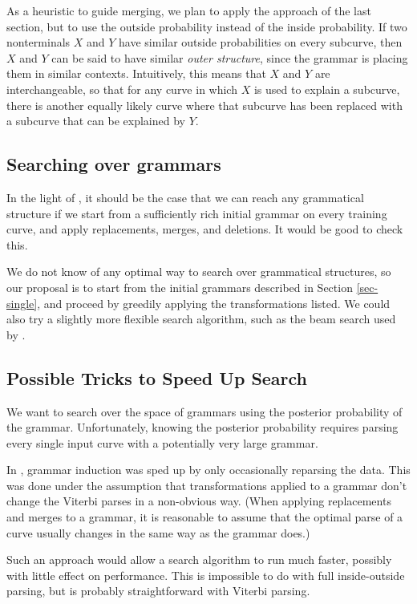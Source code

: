 \documentclass{article}
\begin{document}
As a heuristic to guide merging, we plan to apply the approach of the
last section, but to use the outside probability instead of the inside
probability. If two nonterminals $X$ and $Y$ have similar outside
probabilities on every subcurve, then $X$ and $Y$ can be said to have
similar \emph{outer structure}, since the grammar is placing them in
similar contexts. Intuitively, this means that $X$ and $Y$ are
interchangeable, so that for any curve in which $X$ is used to explain
a subcurve, there is another equally likely curve where that subcurve
has been replaced with a subcurve that can be explained by $Y$.

\subsection{Searching over grammars}

In the light of \cite{stolcke}, it should be the case that we can
reach any grammatical structure if we start from a sufficiently rich
initial grammar on every training curve, and apply replacements,
merges, and deletions. It would be good to check this.

We do not know of any optimal way to search over grammatical
structures, so our proposal is to start from the initial grammars
described in Section \ref{sec-single}, and proceed by greedily applying the
transformations listed. We could also try a slightly more flexible
search algorithm, such as the beam search used by \cite{stolcke}.

\subsection{Possible Tricks to Speed Up Search}
We want to search over the space of grammars using the posterior
probability of the grammar. Unfortunately, knowing the posterior
probability requires parsing every single input curve with a
potentially very large grammar.

In \cite{stolcke}, grammar induction was sped up by only occasionally
reparsing the data. This was done under the assumption that
transformations applied to a grammar don't change the Viterbi parses
in a non-obvious way. (When applying replacements and merges to a
grammar, it is reasonable to assume that the optimal parse of a curve
usually changes in the same way as the grammar does.)

Such an approach would allow a search algorithm to run much faster,
possibly with little effect on performance. This is impossible to do
with full inside-outside parsing, but is probably straightforward with
Viterbi parsing.
\end{document}
